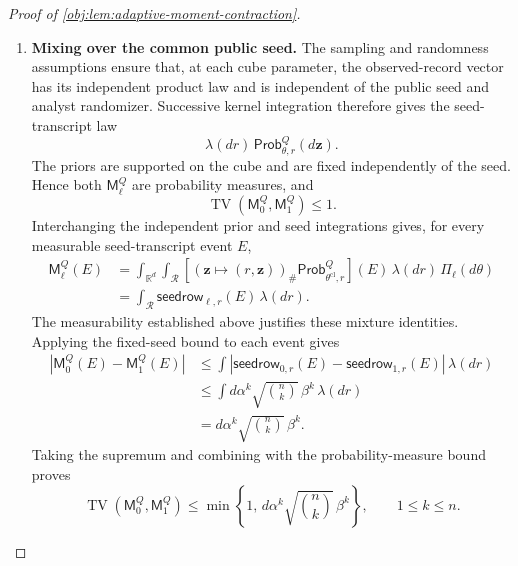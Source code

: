 \begin{proof}[Proof of \cref{obj:lem:adaptive-moment-contraction}]
\begin{enumerate}
\item \textbf{Mixing over the common public seed.}
The sampling and randomness assumptions ensure that, at each cube parameter, the observed-record vector has its independent product law and is independent of the public seed and analyst randomizer. Successive kernel integration therefore gives the seed-transcript law
\[
\lambda(dr)\,\mathsf{Prob}^Q_{\theta,r}(d\mathbf z).
\]
The priors are supported on the cube and are fixed independently of the seed. Hence both \(\mathsf M_\ell^Q\) are probability measures, and
\[
\operatorname{TV}(\mathsf M_0^Q,\mathsf M_1^Q)\le1.
\]
Interchanging the independent prior and seed integrations gives, for every measurable seed-transcript event \(E\),
\[
\begin{split}
\mathsf M_\ell^Q(E)
&=
\int_{\mathbb R^d}\int_{\mathcal R}
 \left[
 (\mathbf z\mapsto(r,\mathbf z))_\#
 \mathsf{Prob}^Q_{\theta^{\mathrm{cl}},r}
 \right](E)\,\lambda(dr)\,\Pi_\ell(d\theta)\\
&=
\int_{\mathcal R}\mathsf{seedrow}_{\ell,r}(E)\,\lambda(dr).
\end{split}
\]
The measurability established above justifies these mixture identities. Applying the fixed-seed bound to each event gives
\[
\begin{split}
|\mathsf M_0^Q(E)-\mathsf M_1^Q(E)|
&\le
\int
 |\mathsf{seedrow}_{0,r}(E)-\mathsf{seedrow}_{1,r}(E)|
 \,\lambda(dr)\\
&\le
\int d\alpha^k\sqrt{\binom nk}\,\beta^k\,\lambda(dr)\\
&=d\alpha^k\sqrt{\binom nk}\,\beta^k.
\end{split}
\]
Taking the supremum and combining with the probability-measure bound proves
\[
\operatorname{TV}(\mathsf M_0^Q,\mathsf M_1^Q)
\le
\min\left\{1,\,
d\alpha^k\sqrt{\binom nk}\,\beta^k\right\},
\qquad 1\le k\le n.
\]


\end{enumerate}
\end{proof}
